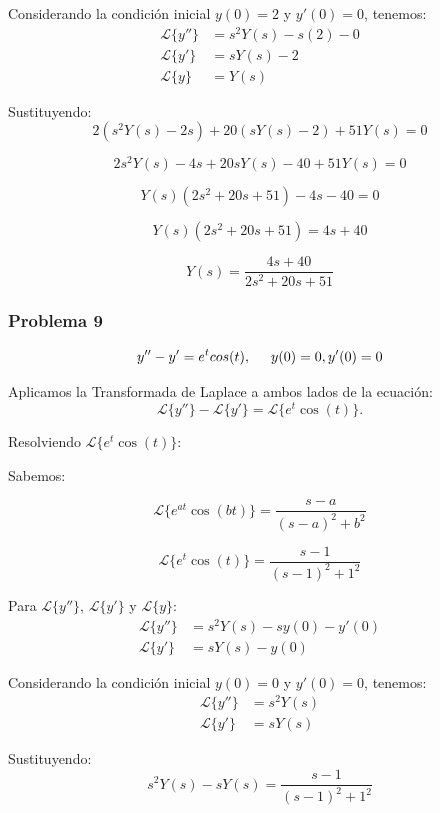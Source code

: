 \documentclass{article}
\begin{document}
Considerando la condición inicial $y(0) = 2$ y $y'(0) = 0$, tenemos:
\begin{align*}
    \mathcal{L}\{y''\} & = s^2Y(s) - s(2) - 0 \\
    \mathcal{L}\{y'\}  & = sY(s) - 2          \\
    \mathcal{L}\{y\}   & = Y(s)
\end{align*}

Sustituyendo:
\[
    2(s^2Y(s) - 2s) + 20(sY(s) - 2) + 51Y(s) = 0
\]

\[
    2s^2Y(s) - 4s + 20sY(s) - 40 + 51Y(s) = 0
\]

\[
    Y(s)(2s^2 + 20s + 51) - 4s - 40 = 0
\]

\[
    Y(s)(2s^2 + 20s + 51) = 4s + 40
\]

\[
    Y(s) = \frac{4s + 40}{2s^2 + 20s + 51}
\]


\newpage


\subsubsection{Problema 9}

\[y'' - y' = e^{t}cos(t), \hspace{.5cm} y(0) = 0, y'(0) = 0 \]

Aplicamos la Transformada de Laplace a ambos lados de la ecuación:
\[
    \mathcal{L}\{y''\} - \mathcal{L}\{y'\} = \mathcal{L}\{e^t\cos(t)\}.
\]

Resolviendo $\mathcal{L}\{e^t\cos(t)\}$:

Sabemos:

\[
    \mathcal{L}\{e^{at}\cos(bt)\} = \frac{s-a}{(s-a)^2 + b^2}
\]

\[
    \mathcal{L}\{e^t\cos(t)\} = \frac{s-1}{(s-1)^2 + 1^2}
\]

Para \(\mathcal{L}\{y''\}\), \(\mathcal{L}\{y'\}\) y \(\mathcal{L}\{y\}\):
\begin{align*}
    \mathcal{L}\{y''\} & = s^2Y(s) - sy(0) - y'(0) \\
    \mathcal{L}\{y'\}  & = sY(s) - y(0)
\end{align*}

Considerando la condición inicial $y(0) = 0$ y $y'(0) = 0$, tenemos:
\begin{align*}
    \mathcal{L}\{y''\} & = s^2Y(s) \\
    \mathcal{L}\{y'\}  & = sY(s)
\end{align*}

Sustituyendo:
\[
    s^2Y(s) - sY(s) = \frac{s-1}{(s-1)^2 + 1^2}
\]
\end{document}
